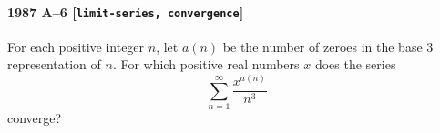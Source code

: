 \paragraph{1987 A--6 \textnormal{[\texttt{limit-series, convergence}]}}
For each positive integer $n$, let $a(n)$ be the number of zeroes in
the base 3 representation of $n$. For which positive real numbers $x$
does the series
\[
\sum_{n=1}^\infty \frac{x^{a(n)}}{n^3}
\]
converge?
